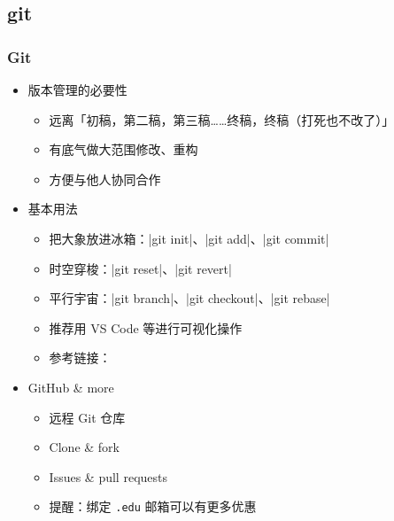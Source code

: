 \subsection{git}
\begin{frame}[fragile]
\frametitle{Git}
\begin{itemize}
  \item<+-> 版本管理的必要性

    \begin{itemize}
      \item 远离「初稿，第二稿，第三稿……终稿，终稿（打死也不改了）」
      \item 有底气做大范围修改、重构
      \item 方便与他人协同合作
    \end{itemize}

  \item<+-> 基本用法

    \begin{itemize}
      \item 把大象放进冰箱：|git init|、|git add|、|git commit|
      \item 时空穿梭：|git reset|、|git revert|
      \item 平行宇宙：|git branch|、|git checkout|、|git rebase|
      \item 推荐用 VS Code 等进行可视化操作
      \item 参考链接：
    \end{itemize}

  \item<+-> GitHub \href{https://github.com}{\faGithub} \& more

    \begin{itemize}
      \item 远程 Git 仓库
      \item Clone \& fork
      \item Issues \& pull requests
      \item<+-> \alert{提醒：绑定 \texttt{.edu} 邮箱可以有更多优惠}
    \end{itemize}
\end{itemize}
\end{frame}